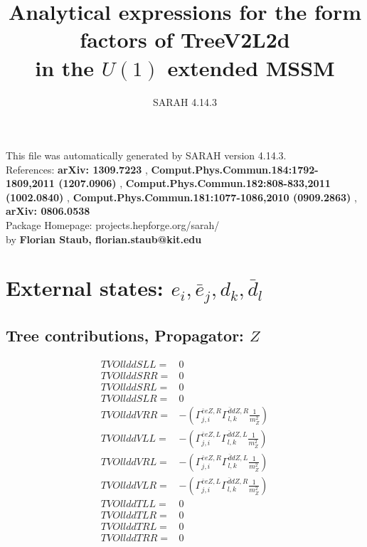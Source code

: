 \documentclass[A4,landscape]{article}
\begin{document}
\title{Analytical expressions for the form factors of TreeV2L2d\\ in the $U(1)$ extended MSSM } 
 \author{SARAH 4.14.3} 
 \maketitle 
 \vspace{10cm} 
This file was automatically generated by SARAH version 4.14.3.  \\ 
References: {\bf arXiv: 1309.7223 }, {\bf Comput.Phys.Commun.184:1792-1809,2011 (1207.0906) }, {\bf Comput.Phys.Commun.182:808-833,2011 (1002.0840) }, {\bf Comput.Phys.Commun.181:1077-1086,2010 (0909.2863) }, {\bf arXiv: 0806.0538 } \\ 
Package Homepage: projects.hepforge.org/sarah/ \\ 
by {\bf Florian Staub, florian.staub@kit.edu} 
 \pagebreak 
 \tableofcontents 
 \pagebreak 
\section{External states: ${e_{{i}}, \bar{e}_{{j}}, d_{{k}}, \bar{d}_{{l}}}$} 
\subsection{Tree contributions, Propagator: $Z$} 

\begin{align} 
  TVOllddSLL= & 0 \\ 
  TVOllddSRR= & 0 \\ 
  TVOllddSRL= & 0 \\ 
  TVOllddSLR= & 0 \\ 
  TVOllddVRR= & -(\Gamma^{\bar{e}e Z ,R}_{j, i} \Gamma^{\bar{d}d Z ,R}_{l, k} \frac{1}{m^2_{Z}}) \\ 
  TVOllddVLL= & -(\Gamma^{\bar{e}e Z ,L}_{j, i} \Gamma^{\bar{d}d Z ,L}_{l, k} \frac{1}{m^2_{Z}}) \\ 
  TVOllddVRL= & -(\Gamma^{\bar{e}e Z ,R}_{j, i} \Gamma^{\bar{d}d Z ,L}_{l, k} \frac{1}{m^2_{Z}}) \\ 
  TVOllddVLR= & -(\Gamma^{\bar{e}e Z ,L}_{j, i} \Gamma^{\bar{d}d Z ,R}_{l, k} \frac{1}{m^2_{Z}}) \\ 
  TVOllddTLL= & 0 \\ 
  TVOllddTLR= & 0 \\ 
  TVOllddTRL= & 0 \\ 
  TVOllddTRR= & 0 \\ 
\end{align} 
\end{document}
